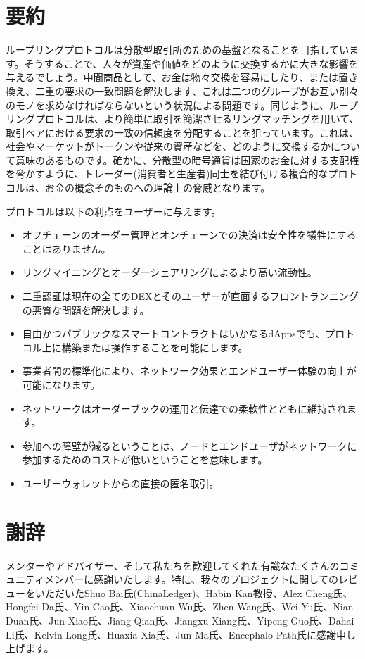 \documentclass{article}
\begin{document}
\begin{multicols}{2}
\section{要約}

ループリングプロトコルは分散型取引所のための基盤となることを目指しています。そうすることで、人々が資産や価値をどのように交換するかに大きな影響を与えるでしょう。中間商品として、お金は物々交換を容易にしたり、または置き換え、二重の要求の一致問題\cite{unenumerated2006}を解決します、これは二つのグループがお互い別々のモノを求めなければならないという状況による問題です。同じように、ループリングプロトコルは、より簡単に取引を簡潔させるリングマッチングを用いて、取引ペアにおける要求の一致の信頼度を分配することを狙っています。これは、社会やマーケットがトークンや従来の資産などを、どのように交換するかについて意味のあるものです。確かに、分散型の暗号通貨は国家のお金に対する支配権を脅かすように、トレーダー(消費者と生産者)同士を結び付ける複合的なプロトコルは、お金の概念そのものへの理論上の脅威となります。

プロトコルは以下の利点をユーザーに与えます。

\begin{itemize}
	\item オフチェーンのオーダー管理とオンチェーンでの決済は安全性を犠牲にすることはありません。
	\item リングマイニングとオーダーシェアリングによるより高い流動性。
	\item 二重認証は現在の全てのDEXとそのユーザーが直面するフロントランニングの悪質な問題を解決します。
	\item 自由かつパブリックなスマートコントラクトはいかなるdAppsでも、プロトコル上に構築または操作することを可能にします。
	\item 事業者間の標準化により、ネットワーク効果とエンドユーザー体験の向上が可能になります。
	\item ネットワークはオーダーブックの運用と伝達での柔軟性とともに維持されます。
	\item 参加への障壁が減るということは、ノードとエンドユーザがネットワークに参加するためのコストが低いということを意味します。
	\item ユーザーウォレットからの直接の匿名取引。
\end{itemize}

\section{謝辞}
メンターやアドバイザー、そして私たちを歓迎してくれた有識なたくさんのコミュニティメンバーに感謝いたします。特に、我々のプロジェクトに関してのレビューをいただいたShuo Bai氏(ChinaLedger)、Habin Kan教授、Alex Cheng氏、Hongfei Da氏、Yin Cao氏、Xiaochuan Wu氏、Zhen Wang氏、Wei Yu氏、Nian Duan氏、Jun Xiao氏、Jiang Qian氏、Jiangxu Xiang氏、Yipeng Guo氏、Dahai Li氏、Kelvin Long氏、Huaxia Xia氏、Jun Ma氏、Encephalo Path氏に感謝申し上げます。






\end{multicols}
\end{document}
